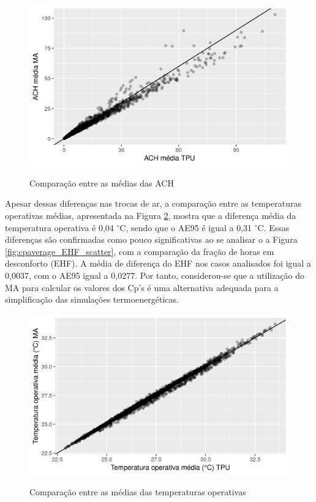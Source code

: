\documentclass[brazil,hardcopy,openany,a4paper]{ufscthesis}
\begin{document}
		\begin{figure}[H]
			\centering
			\caption{Comparação entre as médias das ACH}
			\includegraphics[width=1\linewidth]{img/cpaverage_ACH_scatter.png}
			\label{fig:cpaverage_ACH_scatter}
		\end{figure}
		
		Apesar dessas diferenças nas trocas de ar, a comparação entre as temperaturas operativas médias, apresentada na Figura \ref{fig:cpaverage_temp_scatter}, mostra que a diferença média da temperatura operativa é 0,04 $^{\circ}$C, sendo que o AE95 é igual a 0,31 $^{\circ}$C.
		Essas diferenças são confirmadas como pouco significativas ao se analisar o a Figura \ref{fig:cpaverage_EHF_scatter}, com a comparação da fração de horas em desconforto (EHF). A média de diferença do EHF nos casos analisados foi igual a 0,0037, com o AE95 igual a 0,0277.
		Por tanto, considerou-se que a utilização do MA para calcular os valores dos Cp's é uma alternativa adequada para a simplificação das simulações termoenergéticas.
		
		\begin{figure}[H]
			\centering
			\caption{Comparação entre as médias das temperaturas operativas}
			\includegraphics[width=1\linewidth]{img/cpaverage_temp_scatter.png}
			\label{fig:cpaverage_temp_scatter}
		\end{figure}
	
\end{document}
